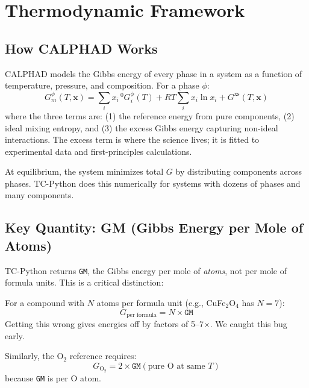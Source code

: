 \documentclass[11pt]{article}
\begin{document}
\section{Thermodynamic Framework}

\subsection{How CALPHAD Works}

CALPHAD models the Gibbs energy of every phase in a system as a function of temperature, pressure, and composition. For a phase $\phi$:
\begin{equation}
    G_m^\phi(T, \mathbf{x}) = \sum_i x_i \,{}^0G_i^\phi(T) + RT \sum_i x_i \ln x_i + G^{\text{xs}}(T, \mathbf{x})
    \label{eq:calphad}
\end{equation}
where the three terms are: (1) the reference energy from pure components, (2) ideal mixing entropy, and (3) the excess Gibbs energy capturing non-ideal interactions. The excess term is where the science lives; it is fitted to experimental data and first-principles calculations.

At equilibrium, the system minimizes total $G$ by distributing components across phases. TC-Python does this numerically for systems with dozens of phases and many components.

\subsection{Key Quantity: GM (Gibbs Energy per Mole of Atoms)}

TC-Python returns \texttt{GM}, the Gibbs energy per mole of \textit{atoms}, not per mole of formula units. This is a critical distinction:

\begin{insight}[GM Normalization]
For a compound with $N$ atoms per formula unit (e.g., CuFe$_2$O$_4$ has $N = 7$):
\[
    G_{\text{per formula}} = N \times \texttt{GM}
\]
Getting this wrong gives energies off by factors of 5--7$\times$. We caught this bug early.
\end{insight}

Similarly, the O$_2$ reference requires:
\[
    G_{\text{O}_2} = 2 \times \texttt{GM}(\text{pure O at same }T)
\]
because \texttt{GM} is per O atom.
\end{document}
